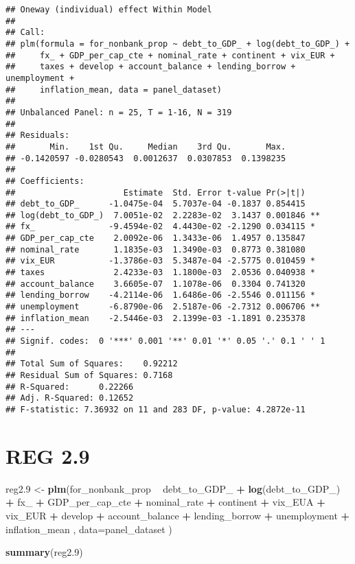 \documentclass[]{article}
\newenvironment{Shaded}{\begin{snugshade}}{\end{snugshade}}
\newcommand{\KeywordTok}[1]{\textcolor[rgb]{0.13,0.29,0.53}{\textbf{#1}}}
\newcommand{\DataTypeTok}[1]{\textcolor[rgb]{0.13,0.29,0.53}{#1}}
\newcommand{\DecValTok}[1]{\textcolor[rgb]{0.00,0.00,0.81}{#1}}
\newcommand{\StringTok}[1]{\textcolor[rgb]{0.31,0.60,0.02}{#1}}
\newcommand{\OperatorTok}[1]{\textcolor[rgb]{0.81,0.36,0.00}{\textbf{#1}}}
\newcommand{\NormalTok}[1]{#1}
\begin{document}
\begin{verbatim}
## Oneway (individual) effect Within Model
## 
## Call:
## plm(formula = for_nonbank_prop ~ debt_to_GDP_ + log(debt_to_GDP_) + 
##     fx_ + GDP_per_cap_cte + nominal_rate + continent + vix_EUR + 
##     taxes + develop + account_balance + lending_borrow + unemployment + 
##     inflation_mean, data = panel_dataset)
## 
## Unbalanced Panel: n = 25, T = 1-16, N = 319
## 
## Residuals:
##       Min.    1st Qu.     Median    3rd Qu.       Max. 
## -0.1420597 -0.0280543  0.0012637  0.0307853  0.1398235 
## 
## Coefficients:
##                      Estimate  Std. Error t-value Pr(>|t|)   
## debt_to_GDP_      -1.0475e-04  5.7037e-04 -0.1837 0.854415   
## log(debt_to_GDP_)  7.0051e-02  2.2283e-02  3.1437 0.001846 **
## fx_               -9.4594e-02  4.4430e-02 -2.1290 0.034115 * 
## GDP_per_cap_cte    2.0092e-06  1.3433e-06  1.4957 0.135847   
## nominal_rate       1.1835e-03  1.3490e-03  0.8773 0.381080   
## vix_EUR           -1.3786e-03  5.3487e-04 -2.5775 0.010459 * 
## taxes              2.4233e-03  1.1800e-03  2.0536 0.040938 * 
## account_balance    3.6605e-07  1.1078e-06  0.3304 0.741320   
## lending_borrow    -4.2114e-06  1.6486e-06 -2.5546 0.011156 * 
## unemployment      -6.8790e-06  2.5187e-06 -2.7312 0.006706 **
## inflation_mean    -2.5446e-03  2.1399e-03 -1.1891 0.235378   
## ---
## Signif. codes:  0 '***' 0.001 '**' 0.01 '*' 0.05 '.' 0.1 ' ' 1
## 
## Total Sum of Squares:    0.92212
## Residual Sum of Squares: 0.7168
## R-Squared:      0.22266
## Adj. R-Squared: 0.12652
## F-statistic: 7.36932 on 11 and 283 DF, p-value: 4.2872e-11
\end{verbatim}

\section{REG 2.9}\label{reg-2.9}

\begin{Shaded}
\begin{Highlighting}[]
\NormalTok{reg2.}\DecValTok{9}\NormalTok{ <-}\StringTok{ }\KeywordTok{plm}\NormalTok{(for_nonbank_prop }\OperatorTok{~}\StringTok{  }\NormalTok{debt_to_GDP_ }\OperatorTok{+}\StringTok{ }\KeywordTok{log}\NormalTok{(debt_to_GDP_) }\OperatorTok{+}\StringTok{ }\NormalTok{fx_ }\OperatorTok{+}\StringTok{ }\NormalTok{GDP_per_cap_cte }\OperatorTok{+}\StringTok{  }\NormalTok{nominal_rate }\OperatorTok{+}\StringTok{ }\NormalTok{continent }\OperatorTok{+}\StringTok{ }\NormalTok{vix_EUA }\OperatorTok{+}\StringTok{ }\NormalTok{vix_EUR  }\OperatorTok{+}\StringTok{ }\NormalTok{develop }\OperatorTok{+}\StringTok{ }\NormalTok{account_balance }\OperatorTok{+}\StringTok{ }\NormalTok{lending_borrow }\OperatorTok{+}\StringTok{ }\NormalTok{unemployment }\OperatorTok{+}\StringTok{ }\NormalTok{inflation_mean , }\DataTypeTok{data=}\NormalTok{panel_dataset  )}

\KeywordTok{summary}\NormalTok{(reg2.}\DecValTok{9}\NormalTok{)}
\end{Highlighting}
\end{Shaded}
\end{document}
